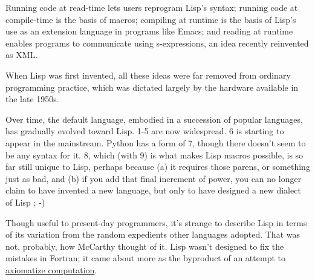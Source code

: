 Running code at read-time lets users
                  reprogram Lisp's syntax; running code at compile-time is the
                  basis of macros; compiling at runtime is the basis of Lisp's
                  use as an extension language in programs like Emacs; and
                  reading at runtime enables programs to communicate using
                  s-expressions, an idea recently reinvented as XML.
                  
                  

When Lisp was first invented, all these ideas were
                  far removed from ordinary programming practice, which was
                  dictated largely by the hardware available in the late
                  1950s.

Over time, the default language, embodied in
                  a succession of popular languages, has gradually evolved
                  toward Lisp. 1-5 are now widespread. 6 is starting to appear
                  in the mainstream. Python has a form of 7, though there
                  doesn't seem to be any syntax for it. 8, which (with 9) is
                  what makes Lisp macros possible, is so far still unique to
                  Lisp, perhaps because (a) it requires those parens, or
                  something just as bad, and (b) if you add that final increment
                  of power, you can no longer claim to have invented a new
                  language, but only to have designed a new dialect of Lisp ;
                  -)

Though useful to present-day programmers, it's
                  strange to describe Lisp in terms of its variation from the
                  random expedients other languages adopted. That was not,
                  probably, how McCarthy thought of it. Lisp wasn't designed to
                  fix the mistakes in Fortran; it came about more as the
                  byproduct of an attempt to
                  \href{http://www.paulgraham.com/rootsoflisp.html}{axiomatize computation}.




              
            
          
